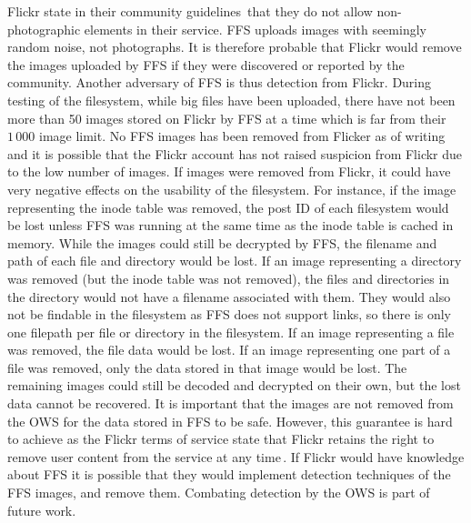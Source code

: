 Flickr state in their community guidelines\,\cite{flickrinc.FlickrCommunityGuidelines2022} that they do not allow non-photographic elements in their service. \gls{FFS} uploads images with seemingly random noise, not photographs. It is therefore probable that Flickr would remove the images uploaded by \gls{FFS} if they were discovered or reported by the community. Another adversary of \gls{FFS} is thus detection from Flickr. During testing of the filesystem, while big files have been uploaded, there have not been more than 50 images stored on Flickr by \gls{FFS} at a time which is far from their $1\,000$ image limit. No \gls{FFS} images has been removed from Flicker as of writing and it is possible that the Flickr account has not raised suspicion from Flickr due to the low number of images. If images were removed from Flickr, it could have very negative effects on the usability of the filesystem. For instance, if the image representing the inode table was removed, the post ID of each filesystem would be lost unless \gls{FFS} was running at the same time as the inode table is cached in memory. While the images could still be decrypted by \gls{FFS}, the filename and path of each file and directory would be lost. If an image representing a directory was removed (but the inode table was not removed), the files and directories in the directory would not have a filename associated with them. They would also not be findable in the filesystem as \gls{FFS} does not support links, so there is only one filepath per file or directory in the filesystem. If an image representing a file was removed, the file data would be lost. If an image representing one part of a file was removed, only the data stored in that image would be lost. The remaining images could still be decoded and decrypted on their own, but the lost data cannot be recovered. It is important that the images are not removed from the \gls{OWS} for the data stored in \gls{FFS} to be safe. However, this guarantee is hard to achieve as the Flickr terms of service state that Flickr retains the right to remove user content from the service at any time\,\cite{flickrinc.FlickrTermsConditions2020}. If Flickr would have knowledge about \gls{FFS} it is possible that they would implement detection techniques of the \gls{FFS} images, and remove them. Combating detection by the \gls{OWS} is part of future work.

%
%
